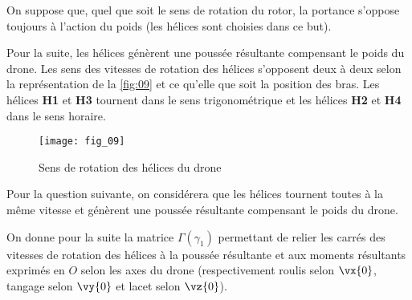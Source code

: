 \begin{hypo}
On suppose que, quel que soit le sens de rotation du rotor, la portance s’oppose toujours à
l’action du poids (les hélices sont choisies dans ce but).
\end{hypo}

\ifprof
\begin{corrige}
\end{corrige}
\else
\fi

Pour la suite, les hélices génèrent une poussée résultante compensant le poids du drone.
Les sens des vitesses de rotation des hélices s’opposent deux à deux selon la représentation
de la \autoref{fig:09} et ce qu’elle que soit la position des bras. Les hélices \textbf{H1} et \textbf{H3} tournent dans
le sens trigonométrique et les hélices \textbf{H2} et \textbf{H4} dans le sens horaire.

\begin{figure}[H]
\centering
\texttt{[image: fig\_09]}
\caption{\label{fig:09} ­Sens de rotation des hélices du drone}
\end{figure}

\ifprof
\begin{corrige}

\end{corrige}
\else
\fi
Pour la question suivante, on considérera que les hélices tournent toutes à la même vitesse
et génèrent une poussée résultante compensant le poids du drone.

\ifprof
\begin{corrige}
\end{corrige}
\else
\fi

On donne pour la suite la matrice $\Gamma (\gamma_1)$ permettant de relier les carrés des vitesses de rotation
des hélices à la poussée résultante et aux moments résultants exprimés en $O$ selon les axes
du drone (respectivement roulis selon $\vx{0}$, tangage selon $\vy{0}$ et lacet selon $\vz{0}$).

